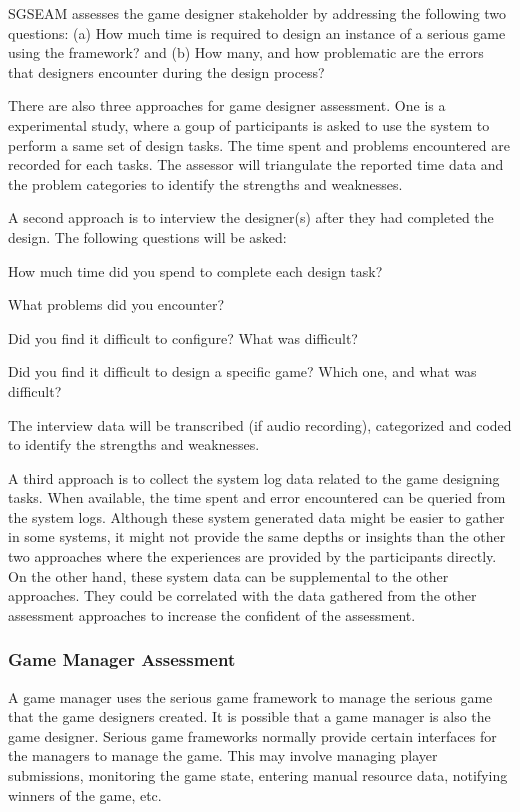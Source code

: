 \documentclass{sigchi}
\begin{document}
SGSEAM assesses the game designer stakeholder by addressing the following two questions: (a) How
much time is required to design an instance of a serious game using the framework? and (b) How
many, and how problematic are the errors that designers encounter during the design process?

There are also three approaches for game designer assessment. One is a experimental study, where a
goup of participants is asked to use the system to perform a same set of design tasks. The time
spent and problems encountered are recorded for each tasks. The assessor will triangulate the
reported time data and the problem categories to identify the strengths and weaknesses.

A second approach is to interview the designer(s) after they had completed the design.
The following questions will be asked:
\begin{compactitem}
\item How much time did you spend to complete each design task?
\item What problems did you encounter?
\item Did you find it difficult to configure? What was difficult?
\item Did you find it difficult to design a specific game? Which one, and what was difficult?
\end{compactitem}

The interview data will be transcribed (if audio recording), categorized and coded to identify the
strengths and weaknesses.

A third approach is to collect the system log data related to the game designing tasks. When
available, the time spent and error encountered can be queried from the system logs. Although these
system generated data might be easier to gather in some systems, it might not provide the same
depths or insights than the other two approaches where the experiences are provided by the
participants directly. On the other hand, these system data can be supplemental to the other
approaches. They could be correlated with the data gathered from the other assessment approaches
 to increase the confident of the assessment.

\subsubsection{Game Manager Assessment}

A game manager uses the serious game framework to manage the serious game that the game
designers created. It is possible that a game manager is also the game designer.
Serious game frameworks normally provide certain interfaces for the managers to manage the
game. This may involve managing player submissions, monitoring the game state, entering
manual resource data, notifying winners of the game, etc.
\end{document}

